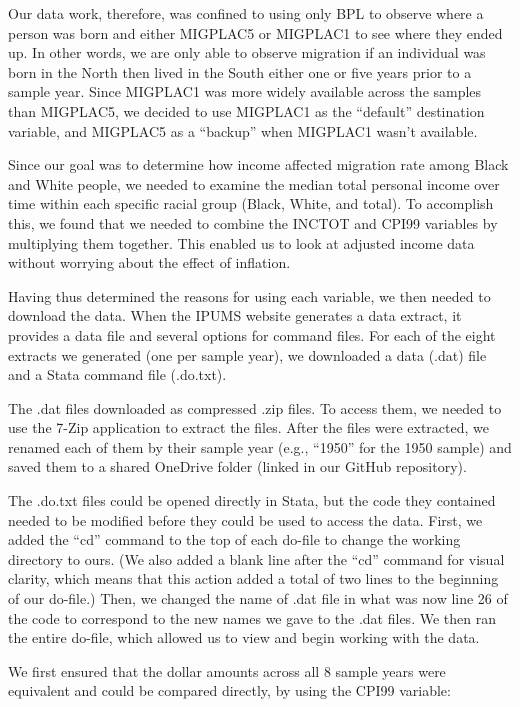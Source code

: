 \documentclass[12pt]{article}
\begin{document}
Our data work, therefore, was confined to using only BPL to observe where a person was born and either MIGPLAC5 or MIGPLAC1 to see where they ended up. In other words, we are only able to observe migration if an individual was born in the North then lived in the South either one or five years prior to a sample year. Since MIGPLAC1 was more widely available across the samples than MIGPLAC5, we decided to use MIGPLAC1 as the “default” destination variable, and MIGPLAC5 as a “backup” when MIGPLAC1 wasn’t available. 

Since our goal was to determine how income affected migration rate among Black and White people, we needed to examine the median total personal income over time within each specific racial group (Black, White, and total). To accomplish this, we found that we needed to combine the INCTOT and CPI99 variables by multiplying them together. This enabled us to look at adjusted income data without worrying about the effect of inflation. 

Having thus determined the reasons for using each variable, we then needed to download the data. When the IPUMS website generates a data extract, it provides a data file and several options for command files. For each of the eight extracts we generated (one per sample year), we downloaded a data (.dat) file and a Stata command file (.do.txt). 

The .dat files downloaded as compressed .zip files. To access them, we needed to use the 7-Zip application to extract the files. After the files were extracted, we renamed each of them by their sample year (e.g., “1950” for the 1950 sample) and saved them to a shared OneDrive folder (linked in our GitHub repository). 

The .do.txt files could be opened directly in Stata, but the code they contained needed to be modified before they could be used to access the data. First, we added the “cd” command to the top of each do-file to change the working directory to ours. (We also added a blank line after the “cd” command for visual clarity, which means that this action added a total of two lines to the beginning of our do-file.) Then, we changed the name of .dat file in what was now line 26 of the code to correspond to the new names we gave to the .dat files. We then ran the entire do-file, which allowed us to view and begin working with the data. 

We first ensured that the dollar amounts across all 8 sample years were equivalent and could be compared directly, by using the CPI99 variable: 
\end{document}
